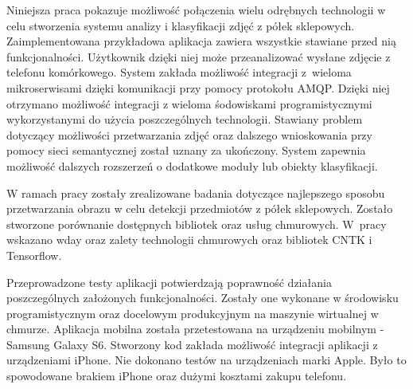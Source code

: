 Niniejsza praca pokazuje możliwość połączenia wielu odrębnych technologii w celu stworzenia systemu analizy i klasyfikacji zdjęć z półek sklepowych. Zaimplementowana przykładowa aplikacja zawiera wszystkie stawiane przed nią funkcjonalności. Użytkownik dzięki niej może przeanalizować wysłane zdjęcie z telefonu komórkowego. System zakłada możliwość integracji z~wieloma mikroserwisami dzięki komunikacji przy pomocy protokołu AMQP. Dzięki niej otrzymano możliwość integracji z wieloma śodowiskami programistycznymi wykorzystanymi do użycia poszczególnych technologii. Stawiany problem dotyczący możliwości przetwarzania zdjęć oraz dalszego wnioskowania przy pomocy sieci semantycznej został uznany za ukończony. System zapewnia możliwość dalszych rozszerzeń o dodatkowe moduły lub obiekty klasyfikacji. 

W ramach pracy zostały zrealizowane badania dotyczące najlepszego sposobu przetwarzania obrazu w celu detekcji przedmiotów z półek sklepowych. Zostało stworzone porównanie dostępnych bibliotek oraz usług chmurowych. W~pracy wskazano wday oraz zalety technologii chmurowych oraz bibliotek CNTK i Tensorflow. 

Przeprowadzone testy aplikacji potwierdzają poprawność działania poszczególnych założonych funkcjonalności. Zostały one wykonane w środowisku programistycznym oraz docelowym produkcyjnym na maszynie wirtualnej w chmurze. Aplikacja mobilna została przetestowana na urządzeniu mobilnym - Samsung Galaxy S6. Stworzony kod zakłada możliwość integracji aplikacji z urządzeniami iPhone. Nie dokonano testów na urządzeniach marki Apple. Było to spowodowane brakiem iPhone oraz dużymi kosztami zakupu telefonu.